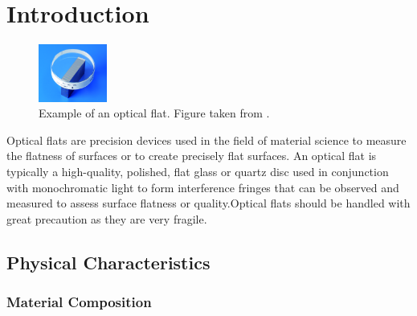 \documentclass[../main.tex]{subfiles}
\begin{document}
\chapter{Introduction}

\vspace{-5pt}

\begin{minipage}{\textwidth}
\begin{figure}
    \vspace{\dimexpr0.3\baselineskip-\topskip}%
    \noindent
    \centering
    \includegraphics[width=0.2\textwidth]{Images/Introduction/optical_flat}
    \vspace{-8pt}
    \caption{Example of an optical flat. Figure taken from \cite{optical_flat_mitutoyo}.}
    \label{fig:optical_flat_example}
\end{figure}
Optical flats are precision devices used in the field of material science to measure the flatness of surfaces or to create precisely flat surfaces. An optical flat is typically a high-quality, polished, flat glass or quartz disc used in conjunction with monochromatic light to form interference fringes that can be observed and measured to assess surface flatness or quality.Optical flats should be handled with great precaution as they are very fragile. \cite{Toru_2017, edmund_optics_optical_flats, kemet_optical_flats, lapmaster_wolters_optical_flats,Paschottaoptical_flats}
\end{minipage}

\vspace{-10pt}

\section{Physical Characteristics}

\vspace{-15pt}

\subsection{Material Composition}
\end{document}
